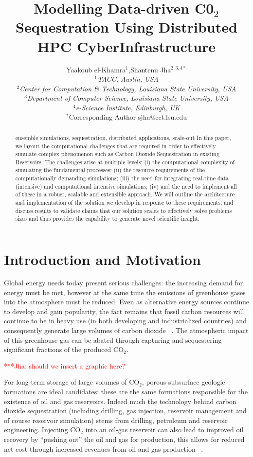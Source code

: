 \documentclass{rspublic}
\title{Modelling Data-driven C0$_{2}$ Sequestration Using Distributed HPC CyberInfrastructure}
\author[el-khamra, jha]{Yaakoub el-Khamra$^{1}$,Shantenu Jha$^{2,3,4*}$ \\
  \small{\emph{$^{1}$TACC, Austin, USA} \\ \emph{$^{2}$Center for
      Computation \& Technology, Louisiana
      State University, USA}\\
    \emph{$^{3}$Department of Computer Science, Louisiana State University, USA}\\
    \emph{$^{4}$e-Science Institute, Edinburgh, UK}} \\
{\footnotesize {\hspace{0.0 in} $^*$Corresponding Author sjha@cct.lsu.edu}}}
\newcommand{\jhanote}[1]{ {\textcolor{red} { ***Jha: #1 }}}
\newcommand{\jhanote}[1]{}
\begin{document}
\maketitle

\begin{abstract}{ensemble simulations, sequestration, distributed
    applications, scale-out} In this paper, we layout the computational challenges
    that are required in order to effectively simulate complex
    phenomenon such as Carbon Dioxide Sequestration in existing
    Reservoirs. The challenges arise at multiple levels: (i) the
    computational complexity of simulating the fundamental processes;
    (ii) the resource requirements of the computationally demanding
    simulations; (iii) the need for integrating real-time data
    (intensive) and computational intensive simulations; (iv) and the
    need to implement all of these in a robust, scalable and
    extensible approach. We will outline the architecture and
    implementation of the solution we develop in response to these
    requirements, and discuss results to validate claims that our
    solution scales to effectively solve problems sizes and thus
    provides the capability to generate novel scientific insight.\end{abstract}

\section{Introduction and Motivation}

Global energy needs today present serious challenges: the increasing
demand for energy must be met, however at the same time the emissions
of greenhouse gases into the atmosphere must be reduced. Even as
alternative energy sources continue to develop and gain popularity,
the fact remains that fossil carbon resources will continue to be in
heavy use (in both developing and industrialized countries) and
consequently generate large volumes of carbon dioxide
~\citep{GeoRPT}. The atmospheric impact of this greenhouse gas can be
abated through capturing and sequestering significant fractions of the
produced CO$_2$.

\jhanote{should we insert a graphic here?}

For long-term storage of large volumes of CO$_2$, porous subsurface
geologic formations are ideal candidates: these are the same
formations responsible for the existence of oil and gas
reservoirs. Indeed much the technology behind carbon dioxide
sequestration (including drilling, gas injection, reservoir management
and of course reservoir simulation) stems from drilling, petroleum and
reservoir engineering. Injecting CO$_2$ into an oil-gas reservoir can
also lead to improved oil recovery by ``pushing out'' the oil and gas
for production, this allows for reduced net cost through increased
revenues from oil and gas production ~\citep{EORBook}.
\end{document}
